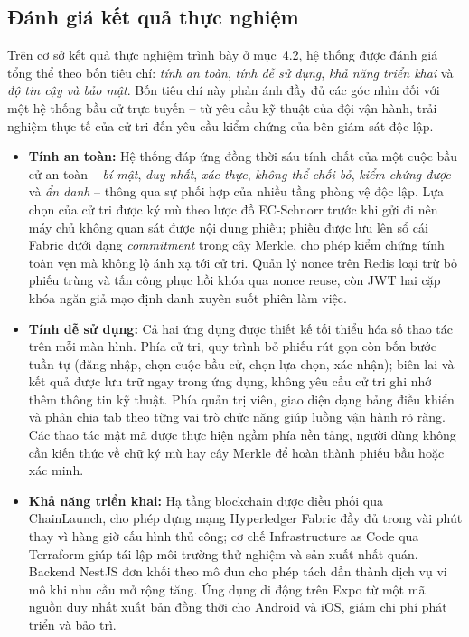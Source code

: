 \subsection{Đánh giá kết quả thực nghiệm}

Trên cơ sở kết quả thực nghiệm trình bày ở mục~4.2, hệ thống được đánh giá tổng thể theo bốn tiêu chí: \textit{tính an toàn}, \textit{tính dễ sử dụng}, \textit{khả năng triển khai} và \textit{độ tin cậy và bảo mật}. Bốn tiêu chí này phản ánh đầy đủ các góc nhìn đối với một hệ thống bầu cử trực tuyến -- từ yêu cầu kỹ thuật của đội vận hành, trải nghiệm thực tế của cử tri đến yêu cầu kiểm chứng của bên giám sát độc lập.

\begin{itemize}
    \item \textbf{Tính an toàn:} Hệ thống đáp ứng đồng thời sáu tính chất của một cuộc bầu cử an toàn -- \textit{bí mật}, \textit{duy nhất}, \textit{xác thực}, \textit{không thể chối bỏ}, \textit{kiểm chứng được} và \textit{ẩn danh} -- thông qua sự phối hợp của nhiều tầng phòng vệ độc lập. Lựa chọn của cử tri được ký mù theo lược đồ EC-Schnorr trước khi gửi đi nên máy chủ không quan sát được nội dung phiếu; phiếu được lưu lên sổ cái Fabric dưới dạng \textit{commitment} trong cây Merkle, cho phép kiểm chứng tính toàn vẹn mà không lộ ánh xạ tới cử tri. Quản lý nonce trên Redis loại trừ bỏ phiếu trùng và tấn công phục hồi khóa qua nonce reuse, còn JWT hai cặp khóa ngăn giả mạo định danh xuyên suốt phiên làm việc.

    \item \textbf{Tính dễ sử dụng:} Cả hai ứng dụng được thiết kế tối thiểu hóa số thao tác trên mỗi màn hình. Phía cử tri, quy trình bỏ phiếu rút gọn còn bốn bước tuần tự (đăng nhập, chọn cuộc bầu cử, chọn lựa chọn, xác nhận); biên lai và kết quả được lưu trữ ngay trong ứng dụng, không yêu cầu cử tri ghi nhớ thêm thông tin kỹ thuật. Phía quản trị viên, giao diện dạng bảng điều khiển và phân chia tab theo từng vai trò chức năng giúp luồng vận hành rõ ràng. Các thao tác mật mã được thực hiện ngầm phía nền tảng, người dùng không cần kiến thức về chữ ký mù hay cây Merkle để hoàn thành phiếu bầu hoặc xác minh.

    \item \textbf{Khả năng triển khai:} Hạ tầng blockchain được điều phối qua ChainLaunch, cho phép dựng mạng Hyperledger Fabric đầy đủ trong vài phút thay vì hàng giờ cấu hình thủ công; cơ chế Infrastructure as Code qua Terraform giúp tái lập môi trường thử nghiệm và sản xuất nhất quán. Backend NestJS đơn khối theo mô đun cho phép tách dần thành dịch vụ vi mô khi nhu cầu mở rộng tăng. Ứng dụng di động trên Expo từ một mã nguồn duy nhất xuất bản đồng thời cho Android và iOS, giảm chi phí phát triển và bảo trì.


\end{itemize}
